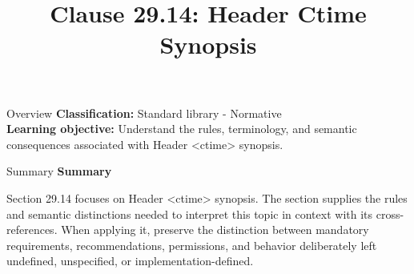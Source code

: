 \documentclass[10pt,letterpaper]{article}
\title{Clause 29.14: Header Ctime Synopsis}
\author{}
\date{}
\begin{document}
\maketitle
\begin{CornellOverviewBox}{Overview}
\textbf{Classification:} Standard library - Normative\\[2pt]
\textbf{Learning objective:} Understand the rules, terminology, and semantic consequences associated with Header <ctime> synopsis.
\end{CornellOverviewBox}\begin{CornellSummaryBox}{Summary}
{\sffamily\bfseries\color{Accent} Summary}\par\vspace{3pt}Section 29.14 focuses on Header <ctime> synopsis. The section supplies the rules and semantic distinctions needed to interpret this topic in context with its cross-references. When applying it, preserve the distinction between mandatory requirements, recommendations, permissions, and behavior deliberately left undefined, unspecified, or implementation-defined.
\end{CornellSummaryBox}
\end{document}
